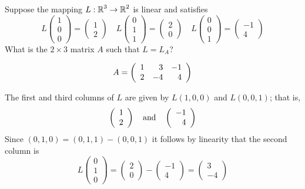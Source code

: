 \documentclass{ximera}
\author{Matthew Carr}
\begin{document}

\begin{exercise}\label{mc.exercise7}

Suppose the mapping $L:\mbox{$\mathbb{R}$}^3\to\mbox{$\mathbb{R}$}^2$ is linear and satisfies
\[
L \left(\begin{array}{c} 1 \\ 0 \\0 \end{array}\right) = \left(\begin{array}{c} 1 \\ 2  \end{array}\right) \quad
L \left(\begin{array}{c} 0 \\ 1\\ 1 \end{array}\right) = \left(\begin{array}{c} 2 \\ 0 \end{array}\right) \quad
L\left(\begin{array}{c} 0 \\ 0 \\ 1 \end{array}\right) = \left(\begin{array}{r} -1 \\ 4 \end{array}\right)
\]
What is the  $2\times 3$ matrix $A$ such that $L = L_A$?

  
\begin{solution}

\ans \[
A = \left(\begin{array}{rrrrrrrrrrrrrrrrrr} 1 & 3 & -1\\ 2 & -4 & 4 \end{array}\right)
\]

\soln 
The first and third columns of $L$ are given by $L(1,0,0)$ and $L(0,0,1)$; that is,
\[
\left(\begin{array}{c} 1 \\ 2  \end{array}\right) \quad\mbox{and}\quad \left(\begin{array}{r} -1 \\ 4 \end{array}\right)
\]
Since $(0,1,0) = (0,1,1) - (0,0,1)$ it follows by linearity that the second column is 
\[
L \left(\begin{array}{c} 0 \\ 1\\ 0 \end{array}\right) = \left(\begin{array}{c} 2 \\ 0  \end{array}\right) - \left(\begin{array}{r} -1 \\ 4 \end{array}\right) = \left(\begin{array}{r} 3 \\ -4 \end{array}\right)
\]
\end{solution}
\end{exercise}
\end{document}
